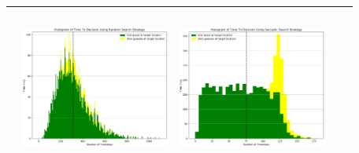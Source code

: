 \begin{landscape}
\begin{table}[h!]
\begin{tabular}{ | c | c | c | c | c |}
\begin{minipage}[c][58mm][c]{49mm}
    \end{minipage}
    &
    \begin{minipage}[c][58mm][c]{49mm}
      \includegraphics[width=49mm, height=52mm]{Chapters/MultiAgentTargetDetection/Figs/Histograms/MultipleAgent/2/SingleAgentSingleSource2RandomHistogram.png}
    \end{minipage}
    &
    \begin{minipage}[c][58mm][c]{49mm}
      \includegraphics[width=49mm, height=52mm]{Chapters/MultiAgentTargetDetection/Figs/Histograms/MultipleAgent/2/SingleAgentSingleSource2SaccadicHistogram.png}
    \end{minipage}
    \\
    \hline


\end{tabular}
\end{table}
\end{landscape}
